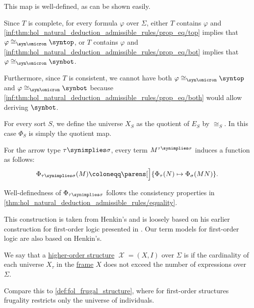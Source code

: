 \begin{definition}
\begin{thmenum}
    This map is well-defined, as can be shown easily.

    Since \( T \) is complete, for every formula \( \varphi \) over \( \Sigma \), either \( T \) contains \( \varphi \) and \ref{inf:thm:hol_natural_deduction_admissible_rules/prop_eq/top} implies that \( \varphi \cong_{\syn\omicron} \syntop \), or \( T \) contains \( \varphi \) and \ref{inf:thm:hol_natural_deduction_admissible_rules/prop_eq/bot} implies that \( \varphi \cong_{\syn\omicron} \synbot \).

    Furthermore, since \( T \) is consistent, we cannot have both \( \varphi \cong_{\syn\omicron} \syntop \) and \( \varphi \cong_{\syn\omicron} \synbot \) because \ref{inf:thm:hol_natural_deduction_admissible_rules/prop_eq/both} would allow deriving \( \synbot \).

     For every sort \( S \), we define the universe \( X_S \) as the quotient of \( E_S \) by \( {\cong_S} \). In this case \( \Phi_S \) is simply the quotient map.

     For the arrow type \( \tau \synimplies \sigma \), every term \( M^{\tau \synimplies \sigma} \) induces a function as follows:
    \begin{equation*}
      \Phi_{\tau \synimplies \sigma}(M) \coloneqq \parens[\Big]{ \Phi_\tau(N) \mapsto \Phi_\sigma(MN) }.
    \end{equation*}

    Well-definedness of \( \Phi_{\tau \synimplies \sigma} \) follows the consistency properties in \cref{thm:hol_natural_deduction_admissible_rules/equality}.
  \end{thmenum}
\end{definition}
\begin{comments}
  \item This construction is taken from Henkin's \cite[thm. 1]{Henkin1950CompletenessInTheoryOfTypes} and is loosely based on his earlier construction for first-order logic presented in \cite{Henkin1949FOLCompleteness}. Our term models for first-order logic are also based on Henkin's.
\end{comments}

\begin{definition}\label{def:hol_frugal_structure}
  We say that a \hyperref[def:hol_structure]{higher-order structure} \( \mscrX = (X, I) \) over \( \Sigma \) is  if the cardinality of each universe \( X_\tau \) in the \hyperref[def:hol_frame]{frame} \( X \) does not exceed the number of expressions over \( \Sigma \).
\end{definition}
\begin{comments}
  \item Compare this to \cref{def:fol_frugal_structure}, where for first-order structures frugality restricts only the universe of individuals.
\end{comments}

